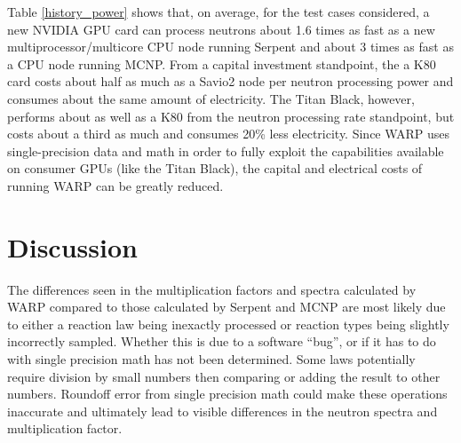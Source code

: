 \documentclass[preprint,12pt]{elsarticle}
\begin{document}
Table \ref{history_power} shows that, on average, for the test cases considered, a new NVIDIA GPU card can process neutrons about 1.6 times as fast as a new multiprocessor/multicore CPU node running Serpent and about 3 times as fast as a CPU node running MCNP.  From a capital investment standpoint, the a K80 card costs about half as much as a Savio2 node per neutron processing power and consumes about the same amount of electricity.  The Titan Black, however, performs about as well as a K80 from the neutron processing rate standpoint, but costs about a third as much and consumes 20\% less electricity.  Since WARP uses single-precision data and math in order to fully exploit the capabilities available on consumer GPUs (like the Titan Black), the capital and electrical costs of running WARP can be greatly reduced. 



\section{Discussion}
\label{sec:disc}

The differences seen in the multiplication factors and spectra calculated by WARP compared to those calculated by Serpent and MCNP are most likely due to either a reaction law being inexactly processed or reaction types being slightly incorrectly sampled.  Whether this is due to a software ``bug'',
 or if it has to do with single precision math has not been determined.  Some laws potentially require division by small numbers then comparing or adding the result to other numbers.  Roundoff error from single precision math could make these operations inaccurate and ultimately lead to visible differences in the neutron spectra and multiplication factor.  
\end{document}
